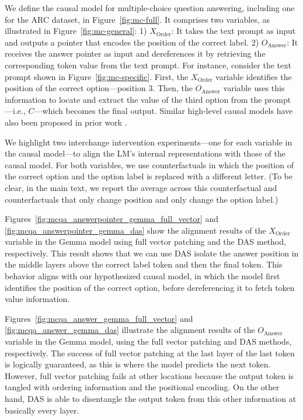 \documentclass{article}
\theoremstyle{plain}
\theoremstyle{definition}
\theoremstyle{remark}
\newcommand{\order}{X_{\text{Order}}}
\newcommand{\answer}{O_{\text{Answer}}}
\begin{document}
We define the causal model for multiple-choice question answering, including one for the ARC dataset, in Figure~\ref{fig:mc-full}. It comprises two variables, as illustrated in Figure~\ref{fig:mc-general}: 1) $\order$: It takes the text prompt as input and outputs a pointer that encodes the position of the correct label. 2) $\answer$: It receives the answer pointer as input and dereferences it by retrieving the corresponding token value from the text prompt. For instance, consider the text prompt shown in Figure~\ref{fig:mc-specific}. First, the $\order$ variable identifies the position of the correct option—position $3$. Then, the $\answer$ variable uses this information to locate and extract the value of the third option from the prompt—i.e., $C$—which becomes the final output. Similar high-level causal models have also been proposed in prior work \cite{lieberum2023doescircuitanalysisinterpretability, PrakashSHBB24}.

We highlight two interchange intervention experiments—one for each variable in the causal model—to align the LM's internal representations with those of the causal model. For both variables, we use counterfactuals in which the position of the correct option and the option label is replaced with a different letter. (To be clear, in the main text, we report the average across this counterfactual and counterfactuals that only change position and only change the option label.)

Figures~\ref{fig:mcqa_answerpointer_gemma_full_vector} and \ref{fig:mcqa_answerpointer_gemma_das} show the alignment results of the $\order$ variable in the Gemma model using full vector patching and the DAS method, respectively. This result shows that we can use DAS isolate the answer position in the middle layers above the correct label token and then the final token. This behavior aligns with our hypothesized causal model, in which the model first identifies the position of the correct option, before dereferencing it to fetch token value information.


Figures~\ref{fig:mcqa_answer_gemma_full_vector} and \ref{fig:mcqa_answer_gemma_das} illustrate the alignment results of the $\answer$ variable in the Gemma model, using the full vector patching and DAS methods, respectively. The success of full vector patching at the last layer of the last token is logically guaranteed, as this is where the model predicts the next token. However, full vector patching fails at other locations because the output token is tangled with ordering information and the positional encoding. On the other hand, DAS is able to disentangle the output token from this other information at basically every layer.
\end{document}
